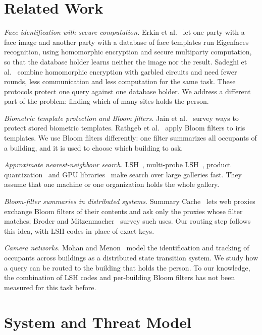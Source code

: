 \documentclass[runningheads]{llncs}
\begin{document}
\section{Related Work}
\label{sec:related}

\emph{Face identification with secure computation.} Erkin et al.~\cite{erkin2009} let one party with a face image
and another party with a database of face templates run Eigenfaces recognition, using homomorphic encryption and
secure multiparty computation, so that the database holder learns neither the image nor the result. Sadeghi et
al.~\cite{sadeghi2010} combine homomorphic encryption with garbled circuits and need fewer rounds, less
communication and less computation for the same task. These protocols protect one query
against one database holder. We address a different part of the problem: finding which of many sites holds the
person.

\emph{Biometric template protection and Bloom filters.} Jain et al.~\cite{jain2008} survey ways to protect stored
biometric templates. Rathgeb et al.~\cite{rathgeb2014} apply Bloom filters to iris templates. We use Bloom filters
differently: one filter summarizes all occupants of a building, and it is used to choose which building to ask.

\emph{Approximate nearest-neighbour search.} LSH~\cite{indyk1998,charikar2002}, multi-probe
LSH~\cite{lv2007}, product quantization~\cite{jegou2011} and GPU libraries~\cite{johnson2021} make search over large
galleries fast. They assume that one machine or one organization holds the whole gallery.

\emph{Bloom-filter summaries in distributed systems.} Summary Cache~\cite{fan2000} lets web proxies exchange Bloom
filters of their contents and ask only the proxies whose filter matches; Broder and Mitzenmacher~\cite{broder2004}
survey such uses. Our routing step follows this idea, with LSH codes in place of exact keys.

\emph{Camera networks.} Mohan and Menon~\cite{mohan2020} model the identification and tracking of occupants across
buildings as a distributed state transition system. We study how a query can be routed to the building that holds the
person. To our knowledge, the combination of LSH codes and per-building Bloom filters has not been measured for this
task before.

\section{System and Threat Model}
\label{sec:model}
\end{document}
